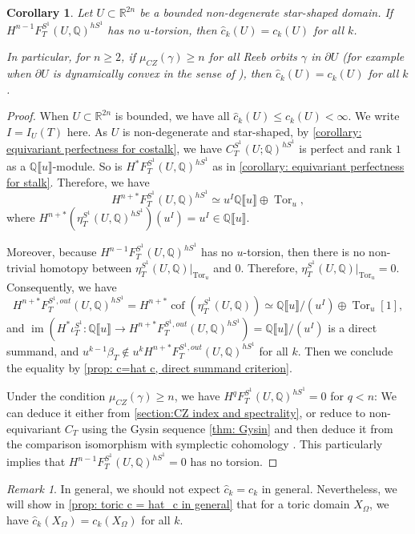 \documentclass[11pt]{amsart}
\numberwithin{equation}{section}
\theoremstyle{plain}
\newtheorem{Coro}[coro]{Corollary}
\theoremstyle{definition}
\theoremstyle{remark}
\newtheorem{RMK}[rmk]{Remark}
\newcommand{\bQ} { {\mathbb{Q}}}
\newcommand{\bR} { {\mathbb{R}}}
\newcommand{\fpw}[1]{{\llbracket #1\rrbracket}}
\newcommand\im{ {\operatorname{im}} }
\newcommand\cof{\operatorname{cof}}
\begin{document}
\begin{Coro}\label{coro: c=hat c, dynamically convex case}Let $U\subset \bR^{2n}$ be a bounded non-degenerate star-shaped domain. If $H^{n-1}F^{S^1}_{T}(U,\bQ)^{hS^1}$ has no $u$-torsion, then $\widehat{c}_k(U)= {c}_k(U)$ for all $k$.

In particular, for $n\geq 2$, if $\mu_{CZ}(\gamma) \geq n$ for all Reeb orbits $\gamma$ in $\partial U$ (for example when $\partial U$ is dynamically convex in the sense of \cite{HWZ1998}), then $\widehat{c}_k(U)= {c}_k(U)$ for all $k$.
\end{Coro}
\begin{proof}When $U\subset \bR^{2n}$ is bounded, we have all $\widehat{c}_k(U)\leq c_k(U)<\infty$. We write $I=I_U(T)$ here. As $U$ is non-degenerate and star-shaped, by \autoref{corollary: equivariant perfectness for costalk}, we have $C_T^{S^1}(U; \bQ)^{hS^1}$ is perfect and rank $1$ as a $\bQ\fpw{u}$-module. So is $H^{*}F^{S^1}_{T}(U,\bQ)^{hS^1}$ as in \autoref{corollary: equivariant perfectness for stalk}. Therefore, we have
\[H^{n+*}F^{S^1}_{T}(U,\bQ)^{hS^1}\simeq u^{I}\bQ\fpw{u}\oplus \operatorname{Tor}_u,\]
where $H^{n+*}(\eta_T^{S^1}(U,\bQ)^{hS^1})(u^{I})=u^{I} \in \bQ\fpw{u}$.

Moreover, because $H^{n-1}F^{S^1}_{T}(U,\bQ)^{hS^1}$ has no $u$-torsion, then there is no non-trivial homotopy between $\eta_T^{S^1}(U,\bQ)|_{\operatorname{Tor}_u}$ and $0$. Therefore, $\eta_T^{S^1}(U,\bQ)|_{\operatorname{Tor}_u}=0$.
Consequently, we have
\[H^{n+*}F^{S^1,out}_{T}(U,\bQ)^{hS^1}= H^{n+*}\cof(\eta_T^{S^1}(U,\bQ))\simeq \bQ\fpw{u}/(u^{I})\oplus \operatorname{Tor}_u[1],\]
and $\im({H^*\iota_T^{S^1}}:\bQ\fpw{u}\rightarrow H^{n+*}F^{S^1,out}_{T}(U,\bQ)^{hS^1})=\bQ\fpw{u}/(u^{I})$ is a direct summand, and $u^{k-1}\beta_T\notin u^kH^{n+*}F^{S^1,out}_{T}(U,\bQ)^{hS^1}$ for all $k$. Then we conclude the equality by \autoref{prop: c=hat c, direct summand criterion}.

Under the condition $\mu_{CZ}(\gamma) \geq n$, we have $H^{q}F^{S^1}_{T}(U,\bQ)^{hS^1}=0$ for $q<n$: We can deduce it either from \autoref{section:CZ index and spectrality}, or reduce to non-equivariant $C_T$ using the Gysin sequence \autoref{thm: Gysin} and then deduce it from the comparison isomorphism with symplectic cohomology \cite{Hochschild-Kuo-Shende-Zhang}. This particularly implies that $H^{n-1}F^{S^1}_{T}(U,\bQ)^{hS^1}=0$ has no torsion.
\end{proof}

\begin{RMK}
In general, we should not expect $\widehat{c}_k= c_k$ in general.
    Nevertheless, we will show in \autoref{prop: toric c = hat_c in general} that for a toric domain $X_\Omega$, we have $\widehat{c}_k(X_\Omega)= c_k(X_\Omega)$ for all $k$.
\end{RMK}
\end{document}

